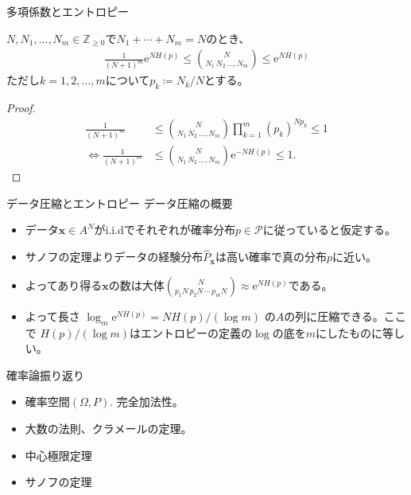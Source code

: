 \documentclass[lualatex,handout]{beamer}
\theoremstyle{definition}
\begin{document}
\begin{frame}{多項係数とエントロピー}
\begin{lemma}
$N,N_1,\dotsc,N_m\in\mathbb{Z}_{\ge 0}$で$N_1+\dotsb+N_m=N$のとき、
\begin{align*}
\frac1{(N+1)^m}\mathrm{e}^{NH(p)}\le
\binom{N}{N_1\,N_2\,\dotsc,N_m} \le \mathrm{e}^{NH(p)}
\end{align*}
ただし$k=1,2,\dotsc,m$について$p_k\coloneq N_k/N$とする。
\end{lemma}
\begin{proof}
\begin{align*}
\frac1{(N+1)^m}&\le
\binom{N}{N_1\,N_2\,\dotsc,N_m} \prod_{k=1}^m (p_k)^{Np_k}\le 1\\
\iff\frac1{(N+1)^m}&\le
\binom{N}{N_1\,N_2\,\dotsc,N_m} \mathrm{e}^{-NH(p)}\le 1.
\end{align*}
\end{proof}
\end{frame}

\begin{frame}{データ圧縮とエントロピー}
データ圧縮の概要

\vspace{2em}
\begin{itemize}
\setlength{\itemsep}{2em}
\item データ$\symbf{x}\in A^N$がi.i.dでそれぞれが確率分布$p\in\mathcal{P}$に従っていると仮定する。
\item サノフの定理よりデータの経験分布$\widehat{P}_{\symbf{x}}$は高い確率で真の分布$p$に近い。
\item よってあり得る$\symbf{x}$の数は大体$\binom{N}{p_1N\,p_2N\,\dotsm\,p_mN}\approx \mathrm{e}^{NH(p)}$である。
\item よって長さ $\log_m \mathrm{e}^{N H(p)} = N H(p)/(\log m)$ の$A$の列に圧縮できる。ここで $H(p)/(\log m)$はエントロピーの定義の$\log$の底を$m$にしたものに等しい。
\end{itemize}
\end{frame}

\begin{frame}{確率論振り返り}
\begin{itemize}
\setlength{\itemsep}{2em}
\item 確率空間$(\Omega, P)$. 完全加法性。
\item 大数の法則、クラメールの定理。
\item 中心極限定理
\item サノフの定理
\end{itemize}
\end{frame}
\end{document}
